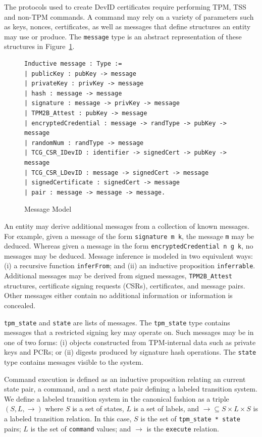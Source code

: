 \documentclass[runningheads]{llncs}
\begin{document}
The protocols used to create DevID certificates require performing
TPM, TSS and non-TPM commands. A command may rely on a variety of
parameters such as keys, nonces, certificates, as well as messages
that define structures an entity may use or produce. The
\verb|message| type is an abstract representation of these structures
in Figure~\ref{fig:message-model}.

\begin{figure}[hbtp]
\begin{lstlisting}[language=Coq]
Inductive message : Type :=
| publicKey : pubKey -> message
| privateKey : privKey -> message
| hash : message -> message
| signature : message -> privKey -> message
| TPM2B_Attest : pubKey -> message
| encryptedCredential : message -> randType -> pubKey -> message
| randomNum : randType -> message
| TCG_CSR_IDevID : identifier -> signedCert -> pubKey -> message
| TCG_CSR_LDevID : message -> signedCert -> message
| signedCertificate : signedCert -> message
| pair : message -> message -> message.
\end{lstlisting}
\caption{Message Model}
\label{fig:message-model}
\end{figure}

An entity may derive additional messages from a collection of known
messages. For example, given a message of the form
\verb|signature m k|, the message \verb|m| may be deduced. Whereas
given a message in the form \verb|encryptedCredential n g k|, no
messages may be deduced. Message inference is modeled in two
equivalent ways: (i) a recursive function \verb|inferFrom|; and (ii)
an inductive proposition \verb|inferrable|.  Additional messages may
be derived from signed messages, \verb|TPM2B_Attest| structures,
certificate signing requests (CSRs), certificates, and message
pairs. Other messages either contain no additional information or
information is concealed.


\verb|tpm_state| and \verb|state| are lists of messages. The
\verb|tpm_state| type contains messages that a restricted signing key
may operate on. Such messages may be in one of two forms: (i) objects
constructed from TPM-internal data such as private keys and PCRs; or
(ii) digests produced by signature hash operations.  The \verb|state|
type contains messages visible to the system.

Command execution is defined as an inductive proposition relating an
current state pair, a command, and a next state pair defining a
labeled transition system. We define a labeled transition system in
the canonical fashion as a triple $(S,L,\rightarrow)$ where $S$ is a
set of states, $L$ is a set of labels, and
$\rightarrow \subseteq S \times L \times S$ is a labeled transition
relation. In this case, $S$ is the set of \verb|tpm_state * state|
pairs; $L$ is the set of \verb|command| values; and $\rightarrow$ is
the \verb|execute| relation.
\end{document}
